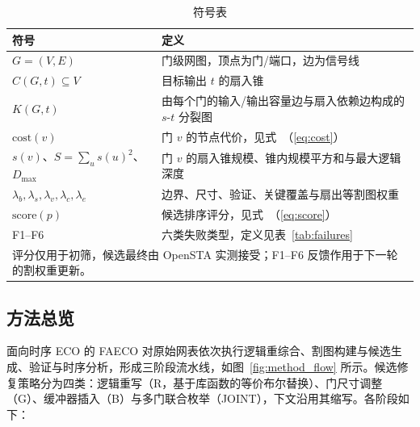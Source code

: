 \documentclass[twocolumn,10pt]{ctexart}
\renewcommand{\eqref}[1]{\textup{（\ref{#1}）}}
\begin{document}
\begin{table}[tbp]
\centering
\caption{符号表}
\label{tab:symbols}
\scriptsize
\setlength{\tabcolsep}{2pt}
\renewcommand{\arraystretch}{0.9}
\begin{tabular}{p{2.6cm}p{4.9cm}}
\toprule
\textbf{符号} & \textbf{定义} \\
\midrule
$G = (V, E)$ & 门级网图，顶点为门/端口，边为信号线 \\
$C(G, t) \subseteq V$ & 目标输出 $t$ 的扇入锥 \\
$K(G, t)$ & 由每个门的输入/输出容量边与扇入依赖边构成的 $s$-$t$ 分裂图 \\
$\mathrm{cost}(v)$ & 门 $v$ 的节点代价，见式~\eqref{eq:cost} \\
$s(v)$、$S=\sum_u s(u)^2$、$D_{\max}$ & 门 $v$ 的扇入锥规模、锥内规模平方和与最大逻辑深度 \\
$\lambda_b,\lambda_s,\lambda_v,\lambda_c,\lambda_e$ & 边界、尺寸、验证、关键覆盖与扇出等割图权重 \\
$\mathrm{score}(p)$ & 候选排序评分，见式~\eqref{eq:score} \\
F1--F6 & 六类失败类型，定义见表~\ref{tab:failures} \\
\bottomrule
\multicolumn{2}{p{7.3cm}}{\footnotesize 评分仅用于初筛，候选最终由 OpenSTA 实测接受；F1--F6 反馈作用于下一轮的割权重更新。}\\
\end{tabular}
\end{table}

\subsection{方法总览}\label{sec:overview}

面向时序 ECO 的 FAECO 对原始网表依次执行逻辑重综合、割图构建与候选生成、验证与时序分析，形成三阶段流水线，如图~\ref{fig:method_flow} 所示。候选修复策略分为四类：逻辑重写（R，基于库函数的等价布尔替换）、门尺寸调整（G）、缓冲器插入（B）与多门联合枚举（JOINT），下文沿用其缩写。各阶段如下：
\end{document}
